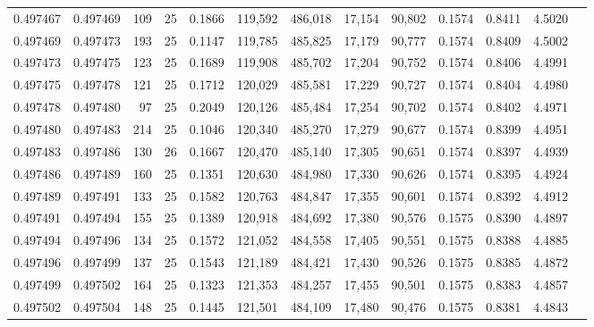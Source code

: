 \begin{tabular}{rrrrrrrrrrrrr}
0.497467 & 0.497469 & 109 &  25 &                                     0.1866 & 119,592 & 486,018 &  17,154 &  90,802 & 0.1574 & 0.8411 & 4.5020 \\
0.497469 & 0.497473 & 193 &  25 &                                     0.1147 & 119,785 & 485,825 &  17,179 &  90,777 & 0.1574 & 0.8409 & 4.5002 \\
0.497473 & 0.497475 & 123 &  25 &                                     0.1689 & 119,908 & 485,702 &  17,204 &  90,752 & 0.1574 & 0.8406 & 4.4991 \\
0.497475 & 0.497478 & 121 &  25 &                                     0.1712 & 120,029 & 485,581 &  17,229 &  90,727 & 0.1574 & 0.8404 & 4.4980 \\
0.497478 & 0.497480 &  97 &  25 &                                     0.2049 & 120,126 & 485,484 &  17,254 &  90,702 & 0.1574 & 0.8402 & 4.4971 \\
0.497480 & 0.497483 & 214 &  25 &                                     0.1046 & 120,340 & 485,270 &  17,279 &  90,677 & 0.1574 & 0.8399 & 4.4951 \\
0.497483 & 0.497486 & 130 &  26 &                                     0.1667 & 120,470 & 485,140 &  17,305 &  90,651 & 0.1574 & 0.8397 & 4.4939 \\
0.497486 & 0.497489 & 160 &  25 &                                     0.1351 & 120,630 & 484,980 &  17,330 &  90,626 & 0.1574 & 0.8395 & 4.4924 \\
0.497489 & 0.497491 & 133 &  25 &                                     0.1582 & 120,763 & 484,847 &  17,355 &  90,601 & 0.1574 & 0.8392 & 4.4912 \\
0.497491 & 0.497494 & 155 &  25 &                                     0.1389 & 120,918 & 484,692 &  17,380 &  90,576 & 0.1575 & 0.8390 & 4.4897 \\
0.497494 & 0.497496 & 134 &  25 &                                     0.1572 & 121,052 & 484,558 &  17,405 &  90,551 & 0.1575 & 0.8388 & 4.4885 \\
0.497496 & 0.497499 & 137 &  25 &                                     0.1543 & 121,189 & 484,421 &  17,430 &  90,526 & 0.1575 & 0.8385 & 4.4872 \\
0.497499 & 0.497502 & 164 &  25 &                                     0.1323 & 121,353 & 484,257 &  17,455 &  90,501 & 0.1575 & 0.8383 & 4.4857 \\
0.497502 & 0.497504 & 148 &  25 &                                     0.1445 & 121,501 & 484,109 &  17,480 &  90,476 & 0.1575 & 0.8381 & 4.4843 \\

\end{tabular}
